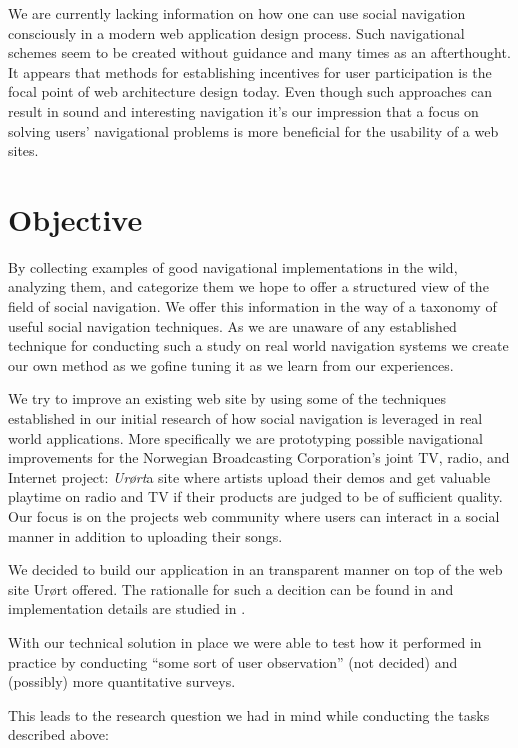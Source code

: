 We are currently lacking information on how one can use social navigation
consciously in a modern web application design process. Such navigational
schemes seem to be created without guidance and many times as an afterthought.
It appears that methods for establishing incentives for user participation
is the focal point of web architecture design today. Even though such
approaches can result in sound and interesting navigation it's our impression
that a focus on solving users' navigational problems is more beneficial for
the usability of a web sites.

\section{Objective}

By collecting examples of good navigational implementations in the wild,
analyzing them, and categorize them we hope to offer a structured view of the
field of social navigation. We offer this information in the way of a taxonomy
of useful social navigation techniques.
As we are unaware of any established technique for
conducting such a study on real world navigation systems we create our own
method as we go\dash{}fine tuning it as we learn from our experiences.

We try to improve an existing web site by using some of the techniques
established in our initial research of how social navigation is leveraged
in real world applications. More specifically we are prototyping possible
navigational improvements for the Norwegian Broadcasting Corporation's joint
TV, radio, and Internet project: \emph{Ur\o{}rt}\dash{}a site where artists
upload their demos and get valuable playtime on radio and TV if their products
are judged to be of sufficient quality. Our focus is on the projects web
community%
where users can interact in a social manner in addition to uploading
their songs.

We decided to build our application in an transparent manner on top of the
web site Ur\o{}rt offered. The rationalle for such a decition can be found in
 and implementation details are studied
in .

With our technical solution in place we were able to test how it performed in
practice by conducting ``some sort of user observation'' (not decided) and
(possibly) more quantitative surveys.

This leads to the research question we had in mind while conducting
the tasks described above:

